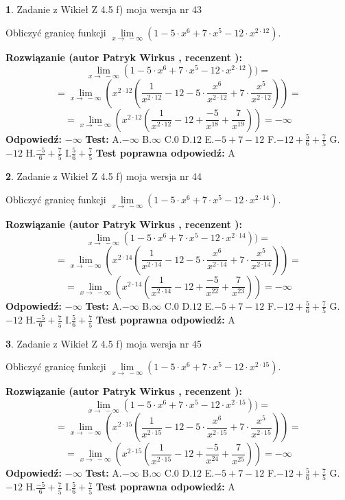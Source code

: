 \documentclass[12pt, a4paper]{article}
\theoremstyle{definition} %
\newtheorem{zad}{}
\newcommand{\zadStart}[1]{\begin{zad}#1\newline}
\newcommand{\zadStop}{\end{zad}}
\newcommand{\rozwStart}[2]{\noindent \textbf{Rozwiązanie (autor #1 , recenzent #2): }\newline}
\newcommand{\rozwStop}{\newline}
\newcommand{\odpStart}{\noindent \textbf{Odpowiedź:}\newline}
\newcommand{\odpStop}{\newline}
\newcommand{\testStart}{\noindent \textbf{Test:}\newline}
\newcommand{\testStop}{\newline}
\newcommand{\kluczStart}{\noindent \textbf{Test poprawna odpowiedź:}\newline}
\newcommand{\kluczStop}{\newline}
\begin{document}
\zadStart{Zadanie z Wikieł Z 4.5 f) moja wersja nr 43}



Obliczyć granicę funkcji  $\lim\limits_{x\to\ -\infty}(1 - 5 \cdot x^{6}+7 \cdot x^{5}- 12 \cdot x^{2\cdot12})$.
\zadStop
\rozwStart{Patryk Wirkus}{}
$$\lim\limits_{x\to\ -\infty}(1 - 5 \cdot x^{6}+7 \cdot x^{5}- 12 \cdot x^{2\cdot12}))=$$
$$=\lim\limits_{x\to\ -\infty}(x^{2\cdot12}(\frac{1}{x^{2\cdot12}}-12 -5 \cdot \frac{x^{6}}{x^{2\cdot12}}+7 \cdot \frac{x^{5}}{x^{2\cdot12}}))=$$
$$=\lim\limits_{x\to\ -\infty}(x^{2\cdot12}(\frac{1}{x^{2\cdot12}}-12 + \frac{-5}{x^{18}}+ \frac{7}{x^{19}}))=-\infty$$
\rozwStop
\odpStart
$-\infty$
\odpStop
\testStart
A.$-\infty$ B.$\infty$ C.$0$ D.$12$ E.$-5 + 7 - 12$
F.$-12+\frac{5}{6}+\frac{7}{5}$ G.$-12$
H.$\frac{-5}{6}+\frac{7}{5}$
I.$\frac{5}{6}+\frac{7}{5}$
\testStop
\kluczStart
A
\kluczStop



\zadStart{Zadanie z Wikieł Z 4.5 f) moja wersja nr 44}



Obliczyć granicę funkcji  $\lim\limits_{x\to\ -\infty}(1 - 5 \cdot x^{6}+7 \cdot x^{5}- 12 \cdot x^{2\cdot14})$.
\zadStop
\rozwStart{Patryk Wirkus}{}
$$\lim\limits_{x\to\ -\infty}(1 - 5 \cdot x^{6}+7 \cdot x^{5}- 12 \cdot x^{2\cdot14}))=$$
$$=\lim\limits_{x\to\ -\infty}(x^{2\cdot14}(\frac{1}{x^{2\cdot14}}-12 -5 \cdot \frac{x^{6}}{x^{2\cdot14}}+7 \cdot \frac{x^{5}}{x^{2\cdot14}}))=$$
$$=\lim\limits_{x\to\ -\infty}(x^{2\cdot14}(\frac{1}{x^{2\cdot14}}-12 + \frac{-5}{x^{22}}+ \frac{7}{x^{23}}))=-\infty$$
\rozwStop
\odpStart
$-\infty$
\odpStop
\testStart
A.$-\infty$ B.$\infty$ C.$0$ D.$12$ E.$-5 + 7 - 12$
F.$-12+\frac{5}{6}+\frac{7}{5}$ G.$-12$
H.$\frac{-5}{6}+\frac{7}{5}$
I.$\frac{5}{6}+\frac{7}{5}$
\testStop
\kluczStart
A
\kluczStop



\zadStart{Zadanie z Wikieł Z 4.5 f) moja wersja nr 45}



Obliczyć granicę funkcji  $\lim\limits_{x\to\ -\infty}(1 - 5 \cdot x^{6}+7 \cdot x^{5}- 12 \cdot x^{2\cdot15})$.
\zadStop
\rozwStart{Patryk Wirkus}{}
$$\lim\limits_{x\to\ -\infty}(1 - 5 \cdot x^{6}+7 \cdot x^{5}- 12 \cdot x^{2\cdot15}))=$$
$$=\lim\limits_{x\to\ -\infty}(x^{2\cdot15}(\frac{1}{x^{2\cdot15}}-12 -5 \cdot \frac{x^{6}}{x^{2\cdot15}}+7 \cdot \frac{x^{5}}{x^{2\cdot15}}))=$$
$$=\lim\limits_{x\to\ -\infty}(x^{2\cdot15}(\frac{1}{x^{2\cdot15}}-12 + \frac{-5}{x^{24}}+ \frac{7}{x^{25}}))=-\infty$$
\rozwStop
\odpStart
$-\infty$
\odpStop
\testStart
A.$-\infty$ B.$\infty$ C.$0$ D.$12$ E.$-5 + 7 - 12$
F.$-12+\frac{5}{6}+\frac{7}{5}$ G.$-12$
H.$\frac{-5}{6}+\frac{7}{5}$
I.$\frac{5}{6}+\frac{7}{5}$
\testStop
\kluczStart
A
\kluczStop
\end{document}
